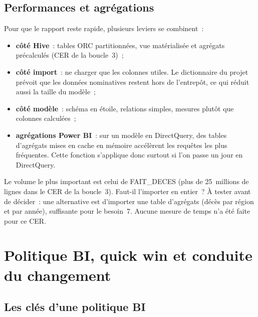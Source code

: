 \subsection{Performances et agrégations}

\noindent Pour que le rapport reste rapide, plusieurs leviers se combinent~:
\begin{itemize}
	\item \textbf{côté Hive}~: tables ORC partitionnées, vue matérialisée et agrégats précalculés (CER de la boucle~3)~;
	\item \textbf{côté import}~: ne charger que les colonnes utiles. Le dictionnaire du projet prévoit que les données nominatives restent hors de l'entrepôt, ce qui réduit aussi la taille du modèle~;
	\item \textbf{côté modèle}~: schéma en étoile, relations simples, mesures plutôt que colonnes calculées~;
	\item \textbf{agrégations Power BI}~: sur un modèle en DirectQuery, des tables d'agrégats mises en cache en mémoire accélèrent les requêtes les plus fréquentes. Cette fonction s'applique donc surtout si l'on passe un jour en DirectQuery.
\end{itemize}

\noindent Le volume le plus important est celui de FAIT\_DECES (plus de 25~millions de lignes dans le CER de la boucle~3). Faut-il l'importer en entier~? À tester avant de décider~: une alternative est d'importer une table d'agrégats (décès par région et par année), suffisante pour le besoin~7. Aucune mesure de temps n'a été faite pour ce CER.

\section{Politique BI, quick win et conduite du changement}\label{sec:politique}

\subsection{Les clés d'une politique BI}

